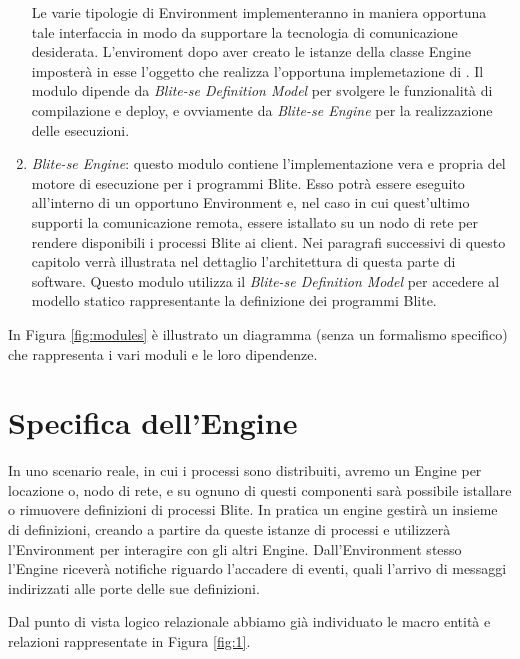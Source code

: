 \begin{enumerate}
	Le varie tipologie di Environment implementeranno in maniera opportuna tale
	interfaccia in modo da supportare la tecnologia di comunicazione desiderata.
	L'enviroment dopo aver creato le istanze della classe Engine imposterà in esse
	l'oggetto che realizza l'opportuna implemetazione di
	. Il modulo dipende da \emph{Blite-se Definition Model}
	per svolgere le funzionalità di compilazione e deploy, e ovviamente da
	\emph{Blite-se Engine} per la realizzazione delle esecuzioni.
	
  \item \emph{Blite-se Engine}: questo modulo contiene l'implementazione vera
  e propria del motore di esecuzione per i programmi Blite. Esso potrà essere
  eseguito all'interno di un opportuno Environment e, nel caso in cui
  quest'ultimo supporti la comunicazione remota, essere istallato su un nodo di
  rete per rendere disponibili i processi Blite ai client. Nei
  paragrafi successivi di questo capitolo verrà illustrata nel dettaglio
  l'architettura di questa parte di software. Questo modulo utilizza il
  \emph{Blite-se Definition Model} per accedere al modello statico
  rappresentante la definizione dei programmi Blite.
  
\end{enumerate}

In Figura \ref{fig:modules} è illustrato un diagramma (senza un
formalismo specifico) che rappresenta i vari moduli e le loro dipendenze.
\newpage

\section{Specifica dell'Engine}

In uno scenario reale, in cui i processi sono distribuiti, avremo un Engine per
locazione o, nodo di rete, e su ognuno di questi componenti sarà possibile
istallare o rimuovere definizioni di processi Blite. In pratica un engine
gestir\`a un insieme di definizioni, creando a partire da queste istanze di
processi e utilizzerà l'Environment per interagire con gli altri Engine. 
Dall'Environment stesso l'Engine riceverà notifiche riguardo l'accadere di
eventi, quali l'arrivo di messaggi indirizzati alle porte delle sue definizioni.

Dal punto di vista logico relazionale abbiamo già individuato le
macro entità e relazioni rappresentate in Figura \ref{fig:1}.

